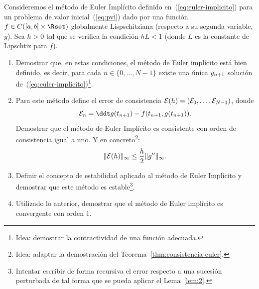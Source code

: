 \begin{EjerciciosPropuestos}
  \begin{problema}
    Consideremos el método de Euler Implícito definido
    en~(\ref{eq:euler-implicito}) para un problema de valor
    inicial~(\ref{eq:pvi}) dado por una función
    $f\in C([a,b]\times\Rset)$ globalmente Lispschitziana (respecto
    a su segunda variable, $y$). Sea $h>0$ tal que se verifica la
    condición $hL<1$ (donde $L$ es la constante de Lipschtiz para
    $f$).
    \begin{enumerate}
    \item Demostrar que, en estas condiciones, el método de Euler
      implícito está bien definido, es decir, para cada $n\in\{0,\dots,N-1\}$
      existe una única ${y_{n+1}}$ solución
      de~(\ref{eq:euler-implicito})\footnote{Idea: demostrar la
        contractividad de una función adecuada.}.
    \item Para este método define el error de consistencia ${\cal E}(h)=({\cal E}_0,\dots,{\cal E}_{N-1})$, donde
      \begin{equation*}
        \label{eq:consistencia-euler-impl}
        \errCons_{n} = \ddt \sol(\tnn)-f(\tnn,\sol(\tnn)).
      \end{equation*}
      Demostrar que el método de Euler Implícito es consistente con
      orden de consistencia igual a uno. Y en concreto\footnote{Idea:
        adaptar la demostración del
        Teorema~\ref{thm:consistencia-euler}.}:
      $$
      \|{\cal E}(h)\|_{\infty} \le \frac h 2  \|g''\|_{\infty}.
      $$

    \item Definir el concepto de estabilidad aplicado al método de
      Euler Implícito y demostrar que este método es
      estable\footnote{Intentar escribir de forma recursiva el error
        respecto a una sucesión perturbada de tal forma que se pueda
        aplicar el Lema~\ref{lem:2}.}.

      \item Utilizado lo anterior, demostrar que el método de Euler
        implícito es convergente con orden 1.
    \end{enumerate}

  \end{problema}


\end{EjerciciosPropuestos}
